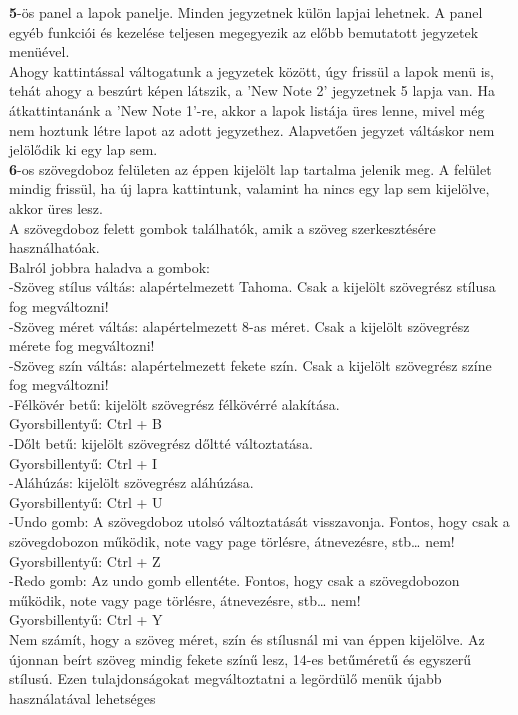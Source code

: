 \vspace{5pt} \noindent \textbf{5}-ös panel a lapok panelje. Minden jegyzetnek külön lapjai lehetnek. A panel egyéb funkciói és kezelése teljesen megegyezik az előbb bemutatott jegyzetek menüével.
\vspace{5pt} \\ Ahogy kattintással váltogatunk a jegyzetek között, úgy frissül a lapok menü is, tehát ahogy a beszúrt képen látszik, a ’New Note 2’ jegyzetnek 5 lapja van. Ha átkattintanánk a ’New Note 1’-re, akkor a lapok listája üres lenne, mivel még nem hoztunk létre lapot az adott jegyzethez. Alapvetően jegyzet váltáskor nem jelölődik ki egy lap sem. 
\vspace{10pt} \\ \textbf{6}-os szövegdoboz felületen az éppen kijelölt lap tartalma jelenik meg. A felület mindig frissül, ha új lapra kattintunk, valamint ha nincs egy lap sem kijelölve, akkor üres lesz.
\\A szövegdoboz felett gombok találhatók, amik a szöveg szerkesztésére használhatóak.
\\Balról  jobbra haladva a gombok: 
\vspace{5pt} \\-Szöveg stílus váltás: alapértelmezett Tahoma. Csak a kijelölt szövegrész stílusa fog megváltozni!
\vspace{5pt} \\-Szöveg méret váltás: alapértelmezett 8-as méret. Csak a kijelölt szövegrész mérete fog megváltozni!
\vspace{5pt} \\-Szöveg szín váltás: alapértelmezett fekete szín. Csak a kijelölt szövegrész színe fog megváltozni!
\vspace{5pt} \\-Félkövér betű: kijelölt szövegrész félkövérré alakítása.
\\Gyorsbillentyű: Ctrl + B
\vspace{5pt} \\-Dőlt betű: kijelölt szövegrész dőltté változtatása.
\\Gyorsbillentyű: Ctrl + I
\vspace{5pt} \\-Aláhúzás: kijelölt szövegrész aláhúzása.
\\Gyorsbillentyű: Ctrl + U
\vspace{5pt} \\-Undo gomb: A szövegdoboz utolsó változtatását visszavonja. Fontos, hogy csak a szövegdobozon működik, note vagy page törlésre, átnevezésre, stb… nem!
\\Gyorsbillentyű: Ctrl + Z
\vspace{5pt} \\-Redo gomb: Az undo gomb ellentéte. Fontos, hogy csak a szövegdobozon működik, note vagy page törlésre, átnevezésre, stb… nem!
\\Gyorsbillentyű: Ctrl + Y
\vspace{10pt} \\Nem számít, hogy a szöveg méret, szín és stílusnál mi van éppen kijelölve. Az újonnan beírt szöveg mindig fekete színű lesz, 14-es betűméretű és egyszerű stílusú. Ezen tulajdonságokat megváltoztatni a legördülő menük újabb használatával lehetséges

